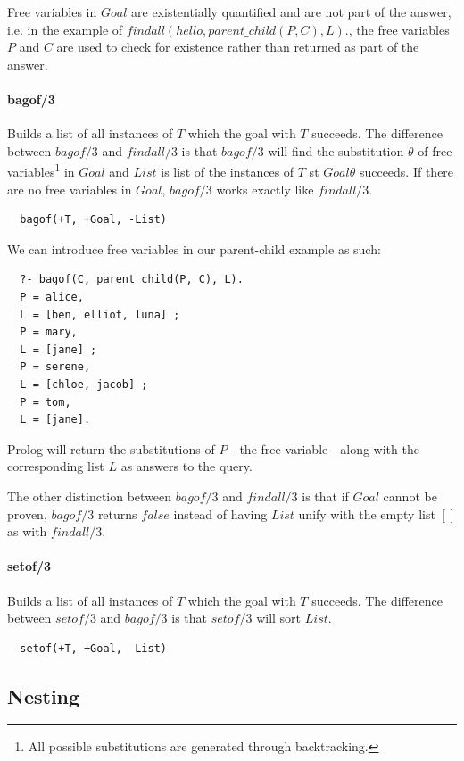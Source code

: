 \documentclass{article}
\begin{document}
\begin{multicols}{2}
  Free variables in $Goal$ are existentially quantified and are not part of the answer, i.e. in the example of $findall(hello, parent\_child(P, C), L).$, the free variables $P$ and $C$ are used to check for existence rather than returned as part of the answer.
  
  \paragraph{bagof/3} Builds a list of all instances of $T$ which the goal with $T$ succeeds. The difference between $bagof/3$ and $findall/3$ is that $bagof/3$ will find the substitution $\theta$ of free variables\footnote{All possible substitutions are generated through backtracking.} in $Goal$ and $List$ is list of the instances of $T$ st $Goal\theta$ succeeds. If there are no free variables in $Goal$, $bagof/3$ works exactly like $findall/3$.
  
  \begin{lstlisting}
  bagof(+T, +Goal, -List)
  \end{lstlisting}
  
  We can introduce free variables in our parent-child example as such:
  
  \begin{lstlisting}
  ?- bagof(C, parent_child(P, C), L).
  P = alice,
  L = [ben, elliot, luna] ;
  P = mary,
  L = [jane] ;
  P = serene,
  L = [chloe, jacob] ;
  P = tom,
  L = [jane].
  \end{lstlisting}
  
  Prolog will return the substitutions of $P$ - the free variable - along with the corresponding list $L$ as answers to the query.
  
  The other distinction between $bagof/3$ and $findall/3$ is that if $Goal$ cannot be proven, $bagof/3$ returns $false$ instead of having $List$ unify with the empty list $[]$ as with $findall/3$.

  \paragraph{setof/3} Builds a list of all instances of $T$ which the goal with $T$ succeeds. The difference between $setof/3$ and $bagof/3$ is that $setof/3$ will sort $List$.
  
  \begin{lstlisting}
  setof(+T, +Goal, -List)
  \end{lstlisting}
  
  \subsection{Nesting}
  

\end{multicols}
\end{document}
